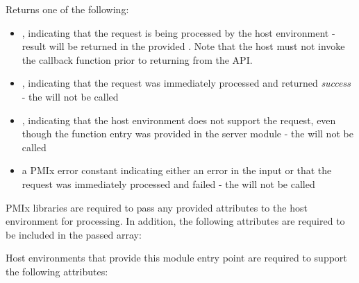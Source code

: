 \begin{arglist}
\end{arglist}

Returns one of the following:

\begin{itemize}
    \item {}, indicating that the request is being processed by the host environment - result will be returned in the provided . Note that the host must not invoke the callback function prior to returning from the \ac{API}.
    \item {}, indicating that the request was immediately processed and returned \textit{success} - the  will not be called
    \item {}, indicating that the host environment does not support the request, even though the function entry was provided in the server module - the  will not be called
    \item a PMIx error constant indicating either an error in the input or that the request was immediately processed and failed - the  will not be called
\end{itemize}

\reqattrstart
\ac{PMIx} libraries are required to pass any provided attributes to the host environment for processing. In addition, the following attributes are required to be included in the passed  array:


\divider

Host environments that provide this module entry point are required to support the following attributes:


